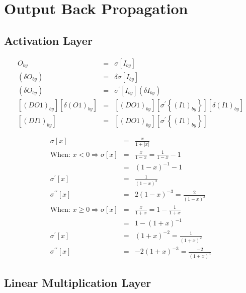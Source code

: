 \section{Output Back Propagation}

\subsection{Activation Layer}

\begin{eqnarray*}
O_{by} & = & \sigma\left[I_{by}\right]\\
\left(\delta O_{by}\right) & = & \delta\sigma\left[I_{by}\right]\\
\left(\delta O_{by}\right) & = & \sigma^{\prime}\left[I_{by}\right]\left(\delta I_{by}\right)\\
\left[\left(DO1\right)_{by}\right]\left[\delta\left(O1\right)_{by}\right] & = & \left[\left(DO1\right)_{by}\right]\left[\sigma^{\prime}\left\{ \left(I1\right)_{by}\right\} \right]\left[\delta\left(I1\right)_{by}\right]\\
\left[\left(DI1\right)_{by}\right] & = & \left[\left(DO1\right)_{by}\right]\left[\sigma^{\prime}\left\{ \left(I1\right)_{by}\right\} \right]
\end{eqnarray*}

\begin{eqnarray*}
\sigma\left[x\right] & = & \frac{x}{1+\left|x\right|}\\
\text{When: }x<0\Rightarrow\sigma\left[x\right] & = & \frac{x}{1-x}=\frac{1}{1-x}-1\\
 & = & \left(1-x\right)^{-1}-1\\
\sigma^{\prime}\left[x\right] & = & \frac{1}{\left(1-x\right)^{2}}\\
\sigma^{\prime\prime}\left[x\right] & = & 2\left(1-x\right)^{-3}=\frac{2}{\left(1-x\right)^{3}}\\
\text{When: }x\ge0\Rightarrow\sigma\left[x\right] & = & \frac{x}{1+x}=1-\frac{1}{1+x}\\
 & = & 1-\left(1+x\right)^{-1}\\
\sigma^{\prime}\left[x\right] & = & \left(1+x\right)^{-2}=\frac{1}{\left(1+x\right)^{2}}\\
\sigma^{\prime\prime}\left[x\right] & = & -2\left(1+x\right)^{-3}=\frac{-2}{\left(1+x\right)^{3}}
\end{eqnarray*}

\subsection{Linear Multiplication Layer}

